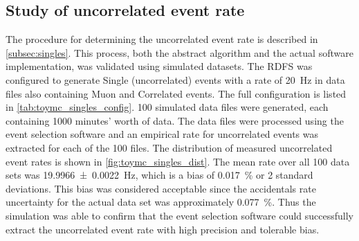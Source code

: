 \subsection{Study of uncorrelated event rate}
\label{subsec:sim_singles}

The procedure for determining the uncorrelated event rate
is described in \cref{subsec:singles}.
This process, both the abstract algorithm and the actual software implementation,
was validated using simulated datasets.
The RDFS was configured to generate Single (uncorrelated) events
with a rate of \SI{20}{\Hz}
in data files also containing Muon and Correlated events.
The full configuration is listed in \cref{tab:toymc_singles_config}.
100 simulated data files were generated,
each containing 1000 minutes' worth of data.
The data files were processed using the event selection software
and an empirical rate for uncorrelated events was extracted
for each of the 100 files.
The distribution of measured uncorrelated event rates
is shown in \cref{fig:toymc_singles_dist}.
The mean rate over all 100 data sets
was \SI{19.9966+-0.0022}{\Hz},
which is a bias of \SI{0.017}{\percent} or 2 standard deviations.
This bias was considered acceptable
since the accidentals rate uncertainty
for the actual data set was approximately \SI{0.077}{\percent}.
Thus the simulation was able to confirm that
the event selection software could successfully extract
the uncorrelated event rate with high precision and tolerable bias.

